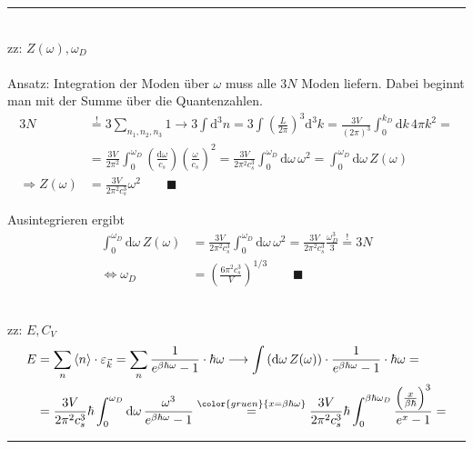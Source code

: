 \documentclass{article}
\newcommand{\diff}{\mathrm{d}}
\newcommand{\lr}[1]{\left(#1\right)}
\newcommand{\comment}[1]{{\color{gruen} {#1}}}
\begin{document}
{\color{violet}
\hrule
	\\
	zz: $Z(\omega), \omega_D$\\
	\\
	Ansatz: Integration der Moden über $\omega$ muss alle $3N$ Moden liefern. Dabei beginnt man mit der Summe über die Quantenzahlen.
		\begin{align*}
			3N &\stackrel{!}{=} 3\sum_{n_1,n_2,n_3} 1 \longrightarrow 3\int \diff^3n = 3\int \lr{\frac{L}{2\pi}}^3 \diff^3 k = \frac{3V}{(2\pi)^3} \int_0^{k_D} \diff k\, 4\pi k^2 = \\
			&= \frac{3V}{2\pi^2} \int_0^{\omega_D} \lr{\frac{\diff\omega}{c_s}} \lr{\frac{\omega}{c_s}}^2 = \frac{3V}{2\pi^2c_s^3} \int_0^{\omega_D} \diff\omega\,\omega^2 = \int_0^{\omega_D} \diff\omega\, Z(\omega) \\
			\Rightarrow Z(\omega) &= \frac{3V}{2\pi^2c_s^3} \omega^2 \qquad\blacksquare
		\end{align*}

	Ausintegrieren ergibt
		\begin{align*}
			\int_0^{\omega_D} \diff\omega\, Z(\omega) &= \frac{3V}{2\pi^2c_s^3}\int_0^{\omega_D} \diff\omega\,\omega^2 = \frac{3V}{2\pi^2c_s^3} \frac{\omega_D^3}{3} \stackrel{!}{=} 3N \\
			\Leftrightarrow \omega_D &= \lr{\frac{6\pi^2c_s^3}{V}}^{1/3} \qquad\blacksquare
		\end{align*}
	
	\\
	zz: $E, C_V$
		\begin{align*}
			E &= \sum_n \braket{n}\cdot \varepsilon_{\vec{k}} = \sum_n \frac{1}{e^{\beta\hbar\omega} - 1} \cdot \hbar\omega \longrightarrow \int \lr{ \diff\omega\, Z(\omega) } \cdot \frac{1}{e^{\beta\hbar\omega} - 1} \cdot \hbar\omega = \\
			&= \frac{3V}{2\pi^2c_s^3} \hbar \int_0^{\omega_D} \diff\omega\, \frac{\omega^3}{e^{\beta\hbar\omega} - 1} \stackrel{\comment{x=\beta\hbar\omega}}{=} \frac{3V}{2\pi^2c_s^3}\hbar \int_0^{\beta\hbar\omega_D} \frac{\lr{\frac{x}{\beta\hbar}}^3}{e^x - 1} = 
		\end{align*}
\hrule
}


\newpage


%
\end{document}
